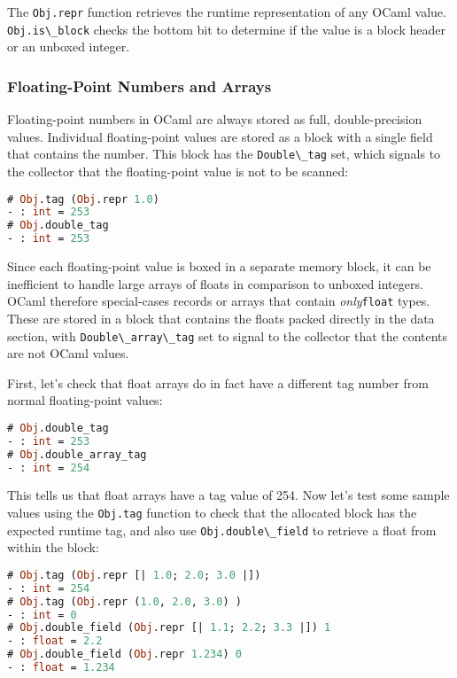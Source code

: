 The \passthrough{\lstinline!Obj.repr!} function retrieves the runtime
representation of any OCaml value.
\passthrough{\lstinline!Obj.is\_block!} checks the bottom bit to
determine if the value is a block header or an unboxed integer.

\hypertarget{floating-point-numbers-and-arrays}{%
\subsubsection{Floating-Point Numbers and
Arrays}\label{floating-point-numbers-and-arrays}}

Floating-point numbers in OCaml are always stored as full,
double-precision values. Individual floating-point values are stored as
a block with a single field that contains the number. This block has the
\passthrough{\lstinline!Double\_tag!} set, which signals to the
collector that the floating-point value is not to be scanned:

\begin{lstlisting}[language=Caml]
# Obj.tag (Obj.repr 1.0)
- : int = 253
# Obj.double_tag
- : int = 253
\end{lstlisting}

Since each floating-point value is boxed in a separate memory block, it
can be inefficient to handle large arrays of floats in comparison to
unboxed integers. OCaml therefore special-cases records or arrays that
contain \emph{only}\passthrough{\lstinline!float!} types. These are
stored in a block that contains the floats packed directly in the data
section, with \passthrough{\lstinline!Double\_array\_tag!} set to signal
to the collector that the contents are not OCaml values.

First, let's check that float arrays do in fact have a different tag
number from normal floating-point values:

\begin{lstlisting}[language=Caml]
# Obj.double_tag
- : int = 253
# Obj.double_array_tag
- : int = 254
\end{lstlisting}

This tells us that float arrays have a tag value of 254. Now let's test
some sample values using the \passthrough{\lstinline!Obj.tag!} function
to check that the allocated block has the expected runtime tag, and also
use \passthrough{\lstinline!Obj.double\_field!} to retrieve a float from
within the block:

\begin{lstlisting}[language=Caml]
# Obj.tag (Obj.repr [| 1.0; 2.0; 3.0 |])
- : int = 254
# Obj.tag (Obj.repr (1.0, 2.0, 3.0) )
- : int = 0
# Obj.double_field (Obj.repr [| 1.1; 2.2; 3.3 |]) 1
- : float = 2.2
# Obj.double_field (Obj.repr 1.234) 0
- : float = 1.234
\end{lstlisting}


